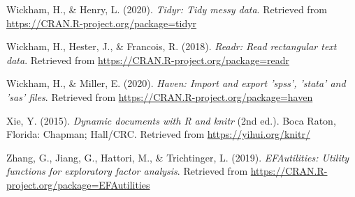 \documentclass[
  english,
  man]{apa6}
\begin{document}
\leavevmode\hypertarget{ref-R-tidyr}{}%
Wickham, H., \& Henry, L. (2020). \emph{Tidyr: Tidy messy data}. Retrieved from \url{https://CRAN.R-project.org/package=tidyr}

\leavevmode\hypertarget{ref-R-readr}{}%
Wickham, H., Hester, J., \& Francois, R. (2018). \emph{Readr: Read rectangular text data}. Retrieved from \url{https://CRAN.R-project.org/package=readr}

\leavevmode\hypertarget{ref-R-haven}{}%
Wickham, H., \& Miller, E. (2020). \emph{Haven: Import and export 'spss', 'stata' and 'sas' files}. Retrieved from \url{https://CRAN.R-project.org/package=haven}

\leavevmode\hypertarget{ref-R-knitr}{}%
Xie, Y. (2015). \emph{Dynamic documents with R and knitr} (2nd ed.). Boca Raton, Florida: Chapman; Hall/CRC. Retrieved from \url{https://yihui.org/knitr/}

\leavevmode\hypertarget{ref-R-EFAutilities}{}%
Zhang, G., Jiang, G., Hattori, M., \& Trichtinger, L. (2019). \emph{EFAutilities: Utility functions for exploratory factor analysis}. Retrieved from \url{https://CRAN.R-project.org/package=EFAutilities}

\endgroup
\end{document}
